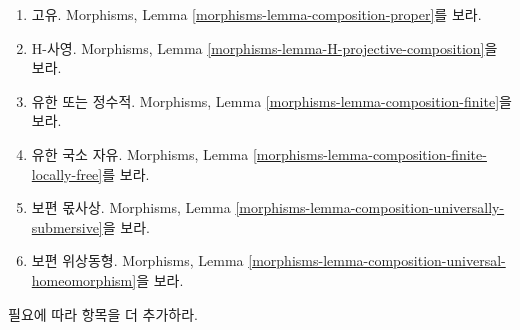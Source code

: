 \begin{remark}
\begin{enumerate}
\item 고유. Morphisms, Lemma
\ref{morphisms-lemma-composition-proper}를 보라.
\item H-사영. Morphisms, Lemma
\ref{morphisms-lemma-H-projective-composition}을 보라.
\item 유한 또는 정수적. Morphisms, Lemma
\ref{morphisms-lemma-composition-finite}을 보라.
\item 유한 국소 자유. Morphisms, Lemma
\ref{morphisms-lemma-composition-finite-locally-free}를 보라.
\item 보편 몫사상. Morphisms, Lemma
\ref{morphisms-lemma-composition-universally-submersive}을 보라.
\item 보편 위상동형. Morphisms, Lemma
\ref{morphisms-lemma-composition-universal-homeomorphism}을 보라.
\end{enumerate}
필요에 따라 항목을 더 추가하라.
\end{remark}

